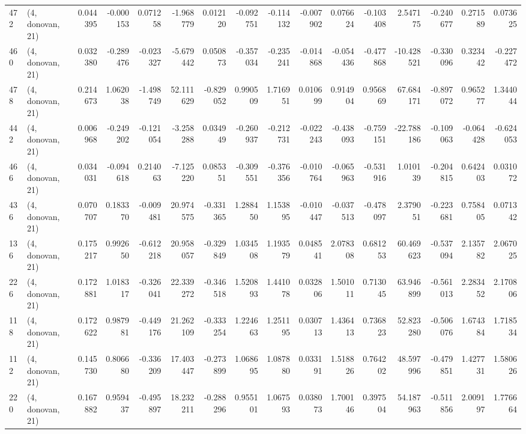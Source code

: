 \begin{tabular}{llrrrrrrrrrrrrrr}
472 &  (4, donovan, 21) &   0.044395 & -0.000153 &  0.071258 &   -1.968779 &  0.012120 &  -0.092751 & -0.114132 & -0.007902 &  0.076624 & -0.103408 &    2.547175 & -0.240677 &  0.271589 &  0.073625 \\
460 &  (4, donovan, 21) &   0.032380 & -0.289476 & -0.023327 &   -5.679442 &  0.050873 &  -0.357034 & -0.235241 & -0.014868 & -0.054436 & -0.477868 &  -10.428521 & -0.330096 &  0.323442 & -0.227472 \\
478 &  (4, donovan, 21) &   0.214673 &  1.062038 & -1.498749 &   52.111629 & -0.829052 &   0.990509 &  1.716951 &  0.010699 &  0.914904 &  0.956869 &   67.684171 & -0.897072 &  0.965277 &  1.344044 \\
442 &  (4, donovan, 21) &   0.006968 & -0.249202 & -0.121054 &   -3.258288 &  0.034949 &  -0.260937 & -0.212731 & -0.022243 & -0.438093 & -0.759151 &  -22.788186 & -0.109063 & -0.064428 & -0.624053 \\
466 &  (4, donovan, 21) &   0.034031 & -0.094618 &  0.214063 &   -7.125220 &  0.085351 &  -0.309551 & -0.376356 & -0.010764 & -0.065963 & -0.531916 &    1.010139 & -0.204815 &  0.642403 &  0.031072 \\
436 &  (4, donovan, 21) &   0.070707 &  0.183370 & -0.009481 &   20.974575 & -0.331365 &   1.288450 &  1.153895 & -0.010447 & -0.037513 & -0.478097 &    2.379051 & -0.223681 &  0.758405 &  0.071342 \\
136 &  (4, donovan, 21) &   0.175217 &  0.992650 & -0.612218 &   20.958057 & -0.329849 &   1.034508 &  1.193579 &  0.048541 &  2.078308 &  0.681253 &   60.469623 & -0.537094 &  2.135782 &  2.067025 \\
226 &  (4, donovan, 21) &   0.172881 &  1.018317 & -0.326041 &   22.339272 & -0.346518 &   1.520893 &  1.441078 &  0.032806 &  1.501011 &  0.713045 &   63.946899 & -0.561013 &  2.283452 &  2.170806 \\
118 &  (4, donovan, 21) &   0.172622 &  0.987981 & -0.449176 &   21.262109 & -0.333254 &   1.224663 &  1.251195 &  0.030713 &  1.436413 &  0.736823 &   52.823280 & -0.506076 &  1.674384 &  1.718534 \\
112 &  (4, donovan, 21) &   0.145730 &  0.806680 & -0.336209 &   17.403447 & -0.273899 &   1.068695 &  1.087880 &  0.033191 &  1.518826 &  0.764202 &   48.597996 & -0.479851 &  1.427731 &  1.580626 \\
220 &  (4, donovan, 21) &   0.167882 &  0.959437 & -0.495897 &   18.232211 & -0.288296 &   0.955101 &  1.067593 &  0.038073 &  1.700146 &  0.397504 &   54.187963 & -0.511856 &  2.009197 &  1.776664 \\

\end{tabular}
